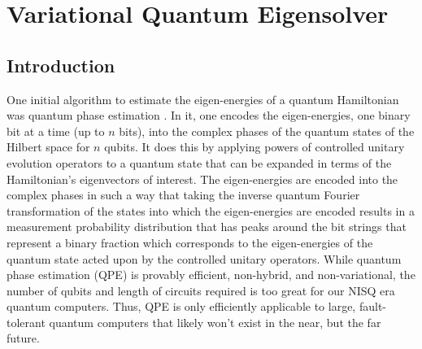 \documentclass[Dual]{msu-thesis}
\begin{document}
\section{Variational Quantum Eigensolver}

\subsection{Introduction}

One initial algorithm to estimate the eigen-energies of a quantum Hamiltonian was quantum phase estimation \cite{ref:qpe}. In it, one encodes the eigen-energies, one binary bit at a time (up to $n$ bits), into the complex phases of the quantum states of the Hilbert space for $n$ qubits. It does this by applying powers of controlled unitary evolution operators to a quantum state that can be expanded in terms of the Hamiltonian's eigenvectors of interest. The eigen-energies are encoded into the complex phases in such a way that taking the inverse quantum Fourier transformation of the states into which the eigen-energies are encoded results in a measurement probability distribution that has peaks around the bit strings that represent a binary fraction which corresponds to the eigen-energies of the quantum state acted upon by the controlled unitary operators. While quantum phase estimation (QPE) is provably efficient, non-hybrid, and non-variational, the number of qubits and length of circuits required is too great for our NISQ era quantum computers. Thus, QPE is only efficiently applicable to large, fault-tolerant quantum computers that likely won't exist in the near, but the far future.
\end{document}
